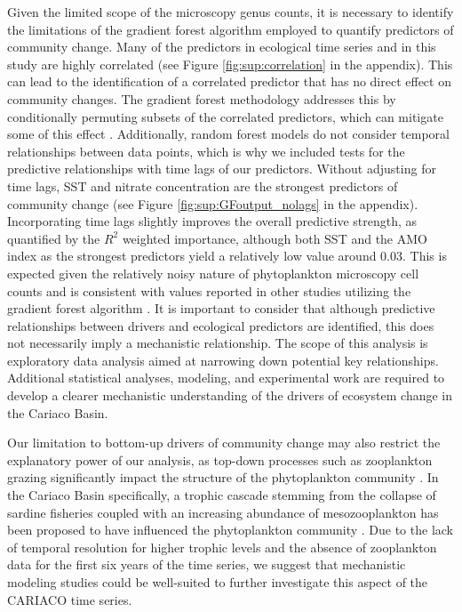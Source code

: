 \documentclass[draft]{agujournal2019}
\begin{document}
Given the limited scope of the microscopy genus counts, it is necessary to identify the limitations of the gradient forest algorithm employed to quantify predictors of community change.
Many of the predictors in ecological time series and in this study are highly correlated (see Figure \ref{fig:sup:correlation} in the appendix). This can lead to the identification of a correlated predictor that has no direct effect on community changes. The gradient forest methodology addresses this by conditionally permuting subsets of the correlated predictors, which can mitigate some of this effect \cite{ellis_gradient_2012}. Additionally, random forest models do not consider temporal relationships between data points, which is why we included tests for the predictive relationships with time lags of our predictors. Without adjusting for time lags, SST and nitrate concentration are the strongest predictors of community change (see Figure \ref{fig:sup:GFoutput_nolags} in the appendix). Incorporating time lags slightly improves the overall predictive strength, as quantified by the $R^2$ weighted importance, although both SST and the AMO index as the strongest predictors yield a relatively low value around \qty{0.03}{}. This is expected given the relatively noisy nature of phytoplankton microscopy cell counts and is consistent with values reported in other studies utilizing the gradient forest algorithm \cite{pitcher_example_2012, roland_pitcher_exploring_2012, roubeix_identification_2016, samhouri_defining_2017, fraker_temporal_2022}. It is important to consider that although predictive relationships between drivers and ecological predictors are identified, this does not necessarily imply a mechanistic relationship. The scope of this analysis is exploratory data analysis aimed at narrowing down potential key relationships. Additional statistical analyses, modeling, and experimental work are required to develop a clearer mechanistic understanding of the drivers of ecosystem change in the Cariaco Basin.
 
Our limitation to bottom-up drivers of community change may also restrict the explanatory power of our analysis, as top-down processes such as zooplankton grazing significantly impact the structure of the phytoplankton community \cite{banas_adding_2011, acevedo-trejos_mechanisms_2015}. In the Cariaco Basin specifically, a trophic cascade stemming from the collapse of sardine fisheries coupled with an increasing abundance of mesozooplankton has been proposed to have influenced the phytoplankton community \cite{muller-karger_scientific_2019}. Due to the lack of temporal resolution for higher trophic levels and the absence of zooplankton data for the first six years of the time series, we suggest that mechanistic modeling studies could be well-suited to further investigate this aspect of the CARIACO time series.
\end{document}
